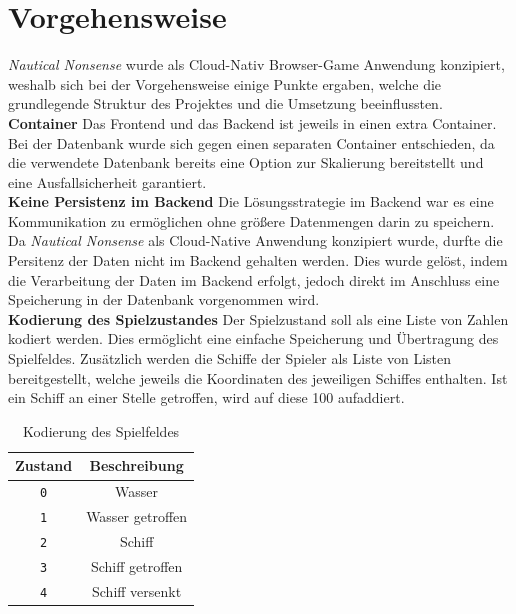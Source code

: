\documentclass[a4paper, 10pt, conference]{IEEEtran}
\begin{document}
\section{Vorgehensweise}\label{sec:vorgehensweise}
\textit{Nautical Nonsense} wurde als Cloud-Nativ Browser-Game Anwendung konzipiert, weshalb sich bei der Vorgehensweise einige Punkte ergaben, welche die grundlegende Struktur des Projektes und die Umsetzung beeinflussten.\\

\textbf{Container} Das Frontend und das Backend ist jeweils in einen extra Container. Bei der Datenbank wurde sich gegen einen separaten Container entschieden, da die verwendete Datenbank bereits eine Option zur Skalierung bereitstellt und eine Ausfallsicherheit garantiert. \\

\textbf{Keine Persistenz im Backend} Die Lösungsstrategie im Backend war es eine Kommunikation zu ermöglichen ohne größere Datenmengen darin zu speichern. Da \textit{Nautical Nonsense} als Cloud-Native Anwendung konzipiert wurde, durfte die Persitenz der Daten nicht im Backend gehalten werden. Dies wurde gelöst, indem die Verarbeitung der Daten im Backend erfolgt, jedoch direkt im Anschluss eine Speicherung in der Datenbank vorgenommen wird. \\

\textbf{Kodierung des Spielzustandes} 
Der Spielzustand soll als eine Liste von Zahlen kodiert werden. Dies ermöglicht eine einfache Speicherung und Übertragung des Spielfeldes. 
Zusätzlich werden die Schiffe der Spieler als Liste von Listen bereitgestellt, welche jeweils die Koordinaten des jeweiligen Schiffes enthalten. Ist ein Schiff an einer Stelle getroffen, wird auf diese 100 aufaddiert. \\

\begin{table}[h!]
    \begin{center}
        \caption{Kodierung des Spielfeldes}
        \label{tab:gamefield}
        \begin{tabular}{|c|c|}
            \textbf{Zustand} & \textbf{Beschreibung}\\
            \hline
            \texttt{0}	& Wasser\\
            \texttt{1}	& Wasser getroffen\\
            \texttt{2}	& Schiff\\
            \texttt{3}	& Schiff getroffen\\
            \texttt{4}	& Schiff versenkt\\
        \end{tabular}
    \end{center}
\end{table}
\end{document}

